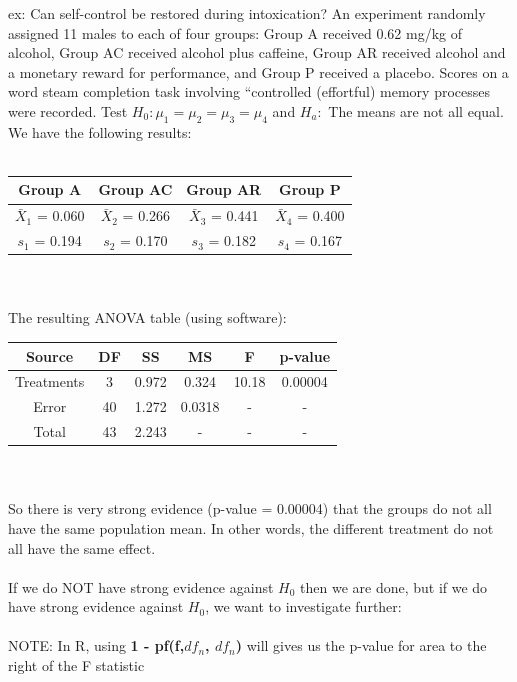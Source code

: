 \documentclass[12pt, a4paper]{article}
\begin{document}
	\noindent ex: Can self-control be restored during intoxication? An experiment randomly assigned 11 males to each of four groups: Group A received 0.62 mg/kg of alcohol, Group AC received alcohol plus caffeine, Group AR received alcohol and a monetary reward for performance, and Group P received a placebo. Scores on a word steam completion task involving ``controlled (effortful) memory processes were recorded. Test $H_0: \mu_1 = \mu_2 = \mu_3 = \mu_4$ and $H_a:$ The means are not all equal. We have the following results: \\~\\
	\begin{tabular}{ |c|c|c|c| }
		\hline
		Group A & Group AC & Group AR & Group P \\ \hline
		$\bar{X}_1$ = 0.060 & $\bar{X}_2$ = 0.266 & $\bar{X}_3$ = 0.441 & $\bar{X}_4$ = 0.400 \\
		$s_1$ = 0.194 & $s_2$ = 0.170 & $s_3$ = 0.182 & $s_4$ = 0.167 \\
		\hline
	\end{tabular} \\~\\
	The resulting ANOVA table (using software): \\
	\begin{tabular}{ |c|c|c|c|c|c| }
		\hline
		Source & DF & SS & MS & F & p-value \\ \hline
		Treatments & 3 & 0.972 & 0.324 & 10.18 & 0.00004 \\
		Error & 40 & 1.272 & 0.0318 & - & - \\
		Total & 43 & 2.243 & - & - & - \\
		\hline
	\end{tabular} \\~\\
	So there is very strong evidence (p-value = 0.00004) that the groups do not all have the same population mean. In other words, the different treatment do not all have the same effect. \\~\\
	If we do NOT have strong evidence against $H_0$ then we are done, but if we do have strong evidence against $H_0$, we want to investigate further: \\~\\
	NOTE: In R, using \textbf{1 - pf(f,$df_n$, $df_n$)} will gives us the p-value for area to the right of the F statistic \\
	
\end{document}
